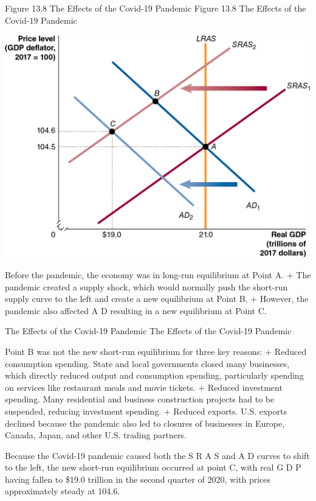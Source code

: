 \documentclass[
  12pt,
  ignorenonframetext,
]{beamer}
\begin{document}
\begin{frame}{Figure 13.8 The Effects of the Covid-19 Pandemic}
\protect\hypertarget{figure-13.8-the-effects-of-the-covid-19-pandemic}{}
Figure 13.8 The Effects of the Covid-19 Pandemic

\includegraphics[width=\textwidth,height=0.99\textheight]{imgs3/img_slide40a.png}

Before the pandemic, the economy was in long-run equilibrium at Point A.
+ The pandemic created a supply shock, which would normally push the
short-run supply curve to the left and create a new equilibrium at Point
B. + However, the pandemic also affected A D resulting in a new
equilibrium at Point C.
\end{frame}

\begin{frame}{The Effects of the Covid-19 Pandemic}
\protect\hypertarget{the-effects-of-the-covid-19-pandemic}{}
The Effects of the Covid-19 Pandemic

Point B was not the new short-run equilibrium for three key reasons: +
Reduced consumption spending. State and local governments closed many
businesses, which directly reduced output and consumption spending,
particularly spending on services like restaurant meals and movie
tickets. + Reduced investment spending. Many residential and business
construction projects had to be suspended, reducing investment spending.
+ Reduced exports. U.S. exports declined because the pandemic also led
to closures of businesses in Europe, Canada, Japan, and other U.S.
trading partners.

Because the Covid-19 pandemic caused both the S R A S and A D curves to
shift to the left, the new short-run equilibrium occurred at point C,
with real G D P having fallen to \$19.0 trillion in the second quarter
of 2020, with prices approximately steady at 104.6.
\end{frame}
\end{document}
